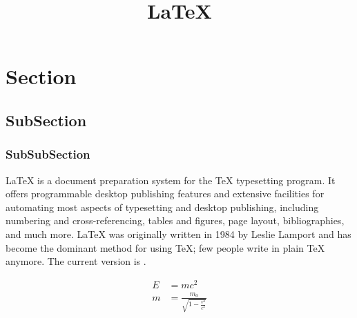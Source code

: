 \documentclass[12pt]{article}
\title{\LaTeX}
\date{}
\begin{document}
\maketitle
\section{Section}
\subsection{SubSection}
\subsubsection{SubSubSection}
\LaTeX{} is a document preparation system for the \TeX{}
typesetting program. It offers programmable desktop publishing
features and extensive facilities for automating most aspects of
typesetting and desktop publishing, including numbering and
cross-referencing, tables and figures, page layout, bibliographies,
and much more. \LaTeX{} was originally written in 1984 by Leslie
Lamport and has become the dominant method for using \TeX; few
people write in plain \TeX{} anymore. The current version is
\LaTeXe.

    \begin{align}
    E &= mc^2                              \\
         m &= \frac{m_0}{\sqrt{1-\frac{v^2}{c^2}}}
    \end{align}
\end{document}
